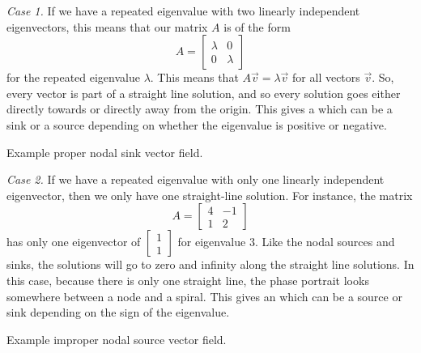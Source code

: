 \documentclass{ximera}
\begin{document}
\emph{Case 1.} If we have a repeated eigenvalue with two linearly independent eigenvectors, this means that our matrix $A$ is of the form
\[ 
    A = \begin{bmatrix} \lambda & 0 \\ 0 & \lambda \end{bmatrix} 
\] 
for the repeated eigenvalue $\lambda$. This means that $A \vec{v} = \lambda \vec{v}$ for all vectors $\vec{v}$. So, every vector is part of a straight line solution, and so every solution goes either directly towards or directly away from the origin. This gives a \emph{} which can be a sink or a source depending on whether the eigenvalue is positive or negative. 

\begin{myfig}
    \capstart
    \caption{Example proper nodal sink vector field.\label{pln:proper-sinkfig}}
\end{myfig}

\emph{Case 2.} If we have a repeated eigenvalue with only one linearly independent eigenvector, then we only have one straight-line solution. For instance, the matrix 
\[ 
    A = \begin{bmatrix} 4 & -1 \\ 1 & 2 \end{bmatrix} 
\] 
has only one eigenvector of $\begin{bmatrix} 1 \\ 1 \end{bmatrix}$ for eigenvalue $3$. Like the nodal sources and sinks, the solutions will go to zero and infinity along the straight line solutions. In this case, because there is only one straight line, the phase portrait looks somewhere between a node and a spiral. This gives an \emph{} which can be a source or sink depending on the sign of the eigenvalue.

\begin{myfig}
    \capstart
    \caption{Example improper nodal source vector field.\label{pln:improper-sourcefig}}
\end{myfig}
\end{document}
